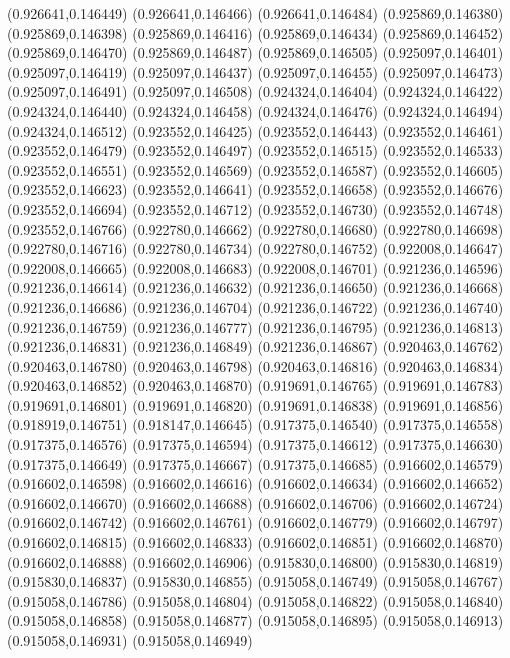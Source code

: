 (0.926641,0.146449)
(0.926641,0.146466)
(0.926641,0.146484)
(0.925869,0.146380)
(0.925869,0.146398)
(0.925869,0.146416)
(0.925869,0.146434)
(0.925869,0.146452)
(0.925869,0.146470)
(0.925869,0.146487)
(0.925869,0.146505)
(0.925097,0.146401)
(0.925097,0.146419)
(0.925097,0.146437)
(0.925097,0.146455)
(0.925097,0.146473)
(0.925097,0.146491)
(0.925097,0.146508)
(0.924324,0.146404)
(0.924324,0.146422)
(0.924324,0.146440)
(0.924324,0.146458)
(0.924324,0.146476)
(0.924324,0.146494)
(0.924324,0.146512)
(0.923552,0.146425)
(0.923552,0.146443)
(0.923552,0.146461)
(0.923552,0.146479)
(0.923552,0.146497)
(0.923552,0.146515)
(0.923552,0.146533)
(0.923552,0.146551)
(0.923552,0.146569)
(0.923552,0.146587)
(0.923552,0.146605)
(0.923552,0.146623)
(0.923552,0.146641)
(0.923552,0.146658)
(0.923552,0.146676)
(0.923552,0.146694)
(0.923552,0.146712)
(0.923552,0.146730)
(0.923552,0.146748)
(0.923552,0.146766)
(0.922780,0.146662)
(0.922780,0.146680)
(0.922780,0.146698)
(0.922780,0.146716)
(0.922780,0.146734)
(0.922780,0.146752)
(0.922008,0.146647)
(0.922008,0.146665)
(0.922008,0.146683)
(0.922008,0.146701)
(0.921236,0.146596)
(0.921236,0.146614)
(0.921236,0.146632)
(0.921236,0.146650)
(0.921236,0.146668)
(0.921236,0.146686)
(0.921236,0.146704)
(0.921236,0.146722)
(0.921236,0.146740)
(0.921236,0.146759)
(0.921236,0.146777)
(0.921236,0.146795)
(0.921236,0.146813)
(0.921236,0.146831)
(0.921236,0.146849)
(0.921236,0.146867)
(0.920463,0.146762)
(0.920463,0.146780)
(0.920463,0.146798)
(0.920463,0.146816)
(0.920463,0.146834)
(0.920463,0.146852)
(0.920463,0.146870)
(0.919691,0.146765)
(0.919691,0.146783)
(0.919691,0.146801)
(0.919691,0.146820)
(0.919691,0.146838)
(0.919691,0.146856)
(0.918919,0.146751)
(0.918147,0.146645)
(0.917375,0.146540)
(0.917375,0.146558)
(0.917375,0.146576)
(0.917375,0.146594)
(0.917375,0.146612)
(0.917375,0.146630)
(0.917375,0.146649)
(0.917375,0.146667)
(0.917375,0.146685)
(0.916602,0.146579)
(0.916602,0.146598)
(0.916602,0.146616)
(0.916602,0.146634)
(0.916602,0.146652)
(0.916602,0.146670)
(0.916602,0.146688)
(0.916602,0.146706)
(0.916602,0.146724)
(0.916602,0.146742)
(0.916602,0.146761)
(0.916602,0.146779)
(0.916602,0.146797)
(0.916602,0.146815)
(0.916602,0.146833)
(0.916602,0.146851)
(0.916602,0.146870)
(0.916602,0.146888)
(0.916602,0.146906)
(0.915830,0.146800)
(0.915830,0.146819)
(0.915830,0.146837)
(0.915830,0.146855)
(0.915058,0.146749)
(0.915058,0.146767)
(0.915058,0.146786)
(0.915058,0.146804)
(0.915058,0.146822)
(0.915058,0.146840)
(0.915058,0.146858)
(0.915058,0.146877)
(0.915058,0.146895)
(0.915058,0.146913)
(0.915058,0.146931)
(0.915058,0.146949)
